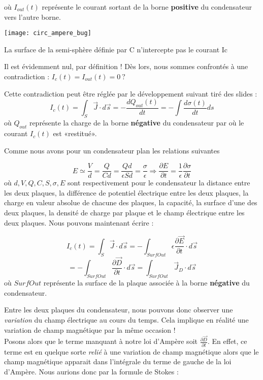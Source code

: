où $I_{out}(t)$ représente le courant sortant de la borne \textbf{positive} du condensateur vers l'autre borne. 
\begin{marginfigure}[0cm]
	\texttt{[image: circ\_ampere\_bug]}
	\caption{La surface de la semi-sphère définie par C n'intercepte pas le courant Ic}
\end{marginfigure}
Il est évidemment nul, par définition ! Dès lors, nous sommes confrontés à une contradiction : $I_{c}(t) = I_{out}(t) = 0\:?$ 

Cette contradiction peut être réglée par le développement suivant tiré des slides :
\[I_{c}(t) = \int_{S} \vec{J} \cdot d\vec{s} = -\frac{dQ_{out}(t)}{dt} = - \int \frac{d \sigma(t)}{dt} ds\] 
où $Q_{out}$ représente la charge de la borne \textbf{négative} du condensateur par où le courant $I_{c}(t)$ est «restitué».

Comme nous avons pour un condensateur plan les relations suivantes 

\[ E \simeq \frac{V}{d} = \frac{Q}{Cd} = \frac{Qd}{\epsilon S d} = \frac{\sigma}{\epsilon} \Rightarrow \frac{\partial E}{\partial t} = \frac{1}{\epsilon} \frac{\partial \sigma}{\partial t} \]
où $d,V,Q,C,S,\sigma,E$ sont respectivement pour le condensateur la distance entre les deux plaques, la différence de potentiel électrique entre les deux plaques, la charge en valeur absolue de chacune des plaques, 
la capacité, la surface d'une des deux plaques, la densité de charge par plaque et le champ électrique entre les deux plaques.
Nous pouvons maintenant écrire :

\[ I_{c}(t) = \int_{S} \vec{J} \cdot d\vec{s} = -\int_{SurfOut} \epsilon \frac{\partial \vec{E}}{\partial t} \cdot d\vec{s} \]
\[ = - \int_{SurfOut} \frac{\partial \vec{D}}{\partial t} \cdot d\vec{s}  =  \int_{SurfOut} \vec{J}_{D} \cdot d\vec{s}\]
où $SurfOut$ représente la surface de la plaque associée à la borne \textbf{négative} du condensateur.

Entre les deux plaques du condensateur, nous pouvons donc observer une \textit{variation} du champ électrique au cours du temps. Cela implique en réalité une variation de champ magnétique par la même occasion ! \\
Posons alors que le terme manquant à notre loi d'Ampère soit $\frac{\partial \vec{D}}{\partial t}$. En effet, ce terme est en quelque sorte \textit{relié} à une variation de champ magnétique alors que le champ magnétique apparait dans l'intégrale du terme de gauche de la loi d'Ampère.
Nous aurions donc par la formule de Stokes : 

